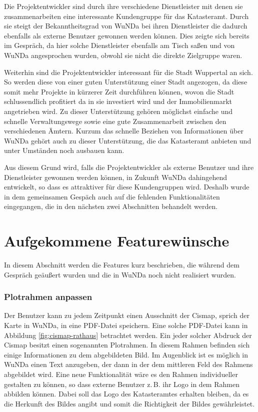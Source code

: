 Die Projektentwickler sind durch ihre verschiedene Dienstleister mit denen sie zusammenarbeiten eine interessante Kundengruppe für das Katasteramt.
Durch sie steigt der Bekanntheitsgrad von \ac{WuNDa} bei ihren Dienstleister die dadurch ebenfalls als externe Benutzer gewonnen werden können.
Dies zeigte sich bereits im Gespräch, da hier solche Dienstleister ebenfalls am Tisch saßen und von \ac{WuNDa} angesprochen wurden, obwohl sie nicht die direkte Zielgruppe waren.

Weiterhin sind die Projektentwickler interessant für die Stadt Wuppertal an sich.
So werden diese von einer guten Unterstützung einer Stadt angezogen, da diese somit mehr Projekte in kürzerer Zeit durchführen können, wovon die Stadt schlussendlich profitiert da in sie investiert wird und der Immobilienmarkt angetrieben wird.
Zu dieser Unterstützung gehören möglichst einfache und schnelle Verwaltungswege sowie eine gute Zusammenarbeit zwischen den verschiedenen Ämtern.
Kurzum das schnelle Beziehen von Informationen über \ac{WuNDa} gehört auch zu dieser Unterstützung, die das Katasteramt anbieten und unter Umständen noch ausbauen kann.

Aus diesem Grund wird, falls die Projektentwickler als externe Benutzer und ihre Dienstleister gewonnen werden können, in Zukunft \ac{WuNDa} dahingehend entwickelt, so dass es attraktiver für diese Kundengruppen wird.
Deshalb wurde in dem gemeinsamen Gespäch auch auf die fehlenden Funktionalitäten eingegangen, die in den nächsten zwei Abschnitten behandelt werden.

\section{Aufgekommene Featurewünsche}
In diesem Abschnitt werden die Features kurz beschrieben, die während dem Gespräch geäußert wurden und die in \ac{WuNDa} noch nicht realisiert wurden.
\subsubsection{Plotrahmen anpassen}
Der Benutzer kann zu jedem Zeitpunkt einen Ausschnitt der Cismap, sprich der Karte in \ac{WuNDa}, in eine PDF-Datei speichern.
Eine solche PDF-Datei kann in Abbildung \vref{fig:cismap-rathaus} betrachtet werden.
Ein jeder solcher Abdruck der Cismap besitzt einen sogenannten Plotrahmen. In diesem Rahmen befinden sich einige Informationen zu dem abgebildeten Bild.
Im Augenblick ist es möglich in \ac{WuNDa} einen Text anzugeben, der dann in der dem mittleren Feld des Rahmens abgebildet wird.
Eine neue Funktionalität wäre es den Rahmen individueller gestalten zu können, so dass externe Benutzer z.\,B. ihr Logo in dem Rahmen abbilden können.
Dabei soll das Logo des Katasteramtes erhalten bleiben, da es die Herkunft des Bildes angibt und somit die Richtigkeit der Bildes gewährleistet. 
